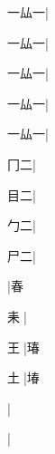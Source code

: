 \begin{multicols}{2}
{{\cjk{}一厸一}|{}\par
{\cjk{}一厸一}|{}\par
{\cjk{}一厸一}|{}\par
{\cjk{}一厸一}|{}\par
{\cjk{}一厸一}|{}\par
{\cjk{}{\cnsym{}　}冂二}\mktsJzrVerticalBar{}{\cjk{}{\cnsym{}　}{\cnsym{}　}{\cnsym{}　}}|{}\par
{\cjk{}{\cnsym{}　}目二}\mktsJzrVerticalBar{}{\cjk{}{\cnsym{}　}{\cnsym{}　}{\cnsym{}　}}|{}\par
{\cjk{}{\cnsym{}　}勹二}\mktsJzrVerticalBar{}{\cjk{}{\cnsym{}　}{\cnsym{}　}{\cnsym{}　}}|{}\par
{\cjk{}{\cnsym{}　}尸二}\mktsJzrVerticalBar{}{\cjk{}{\cnsym{}　}{\cnsym{}　}{\cnsym{}　}}|{}\par
{}\mktsJzrVerticalBar{}{\cjk{}{\cnsym{}　}{\cnsym{}　}{\cnsym{}　}}|{\cjk{}春}\par
{\cjk{}{\cnsym{}　}耒{\cnxJzr{}}}\mktsJzrVerticalBar{}{\cjk{}{\cnsym{}　}{\cnsym{}　}{\cnsym{}　}}|{}\par
{\cjk{}{\cnsym{}　}王{\cnxJzr{}}}\mktsJzrVerticalBar{}{\cjk{}{\cnsym{}　}{\cnsym{}　}{\cnsym{}　}}|{\cjk{}瑃}\par
{\cjk{}{\cnsym{}　}土{\cnxJzr{}}}\mktsJzrVerticalBar{}{\cjk{}{\cnsym{}　}{\cnsym{}　}{\cnsym{}　}}|{\cjk{}堾}\par
{}\mktsJzrVerticalBar{}{\cjk{}{\cnsym{}　}{\cnsym{}　}{\cnsym{}　}}|{}\par
{}\mktsJzrVerticalBar{}{\cjk{}{\cnsym{}　}{\cnsym{}　}{\cnsym{}　}}|{}\par
}
\end{multicols}
